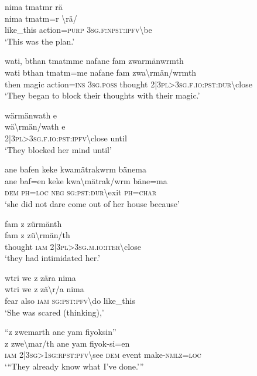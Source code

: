 \ea\label{ex:7:a4800}
nima tmatmr rä\\
\gll nima	tmatm=r	{\textbackslash}rä/\\
     like\_this	action=\textsc{purp}	3\textsc{sg}.\textsc{f}:\textsc{npst}:\textsc{ipfv}{\textbackslash}be\\
\glt `This was the plan.'
\z

\ea\label{ex:7:a4801}
wati, bthan tmatmme nafane fam zwarmänwrmth\\
\gll wati	bthan	tmatm=me	nafane	fam	zwa{\textbackslash}rmän/wrmth\\
     then	magic	action=\textsc{ins}	3\textsc{sg}.\textsc{poss}	thought	2|3\textsc{pl}>3\textsc{sg}.\textsc{f}.\textsc{io}:\textsc{pst}:\textsc{dur}{\textbackslash}close\\
\glt `They began to block their thoughts with their magic.'
\z

\ea\label{ex:7:a4802}
wärmänwath e\\
\gll wä{\textbackslash}rmän/wath	e\\
     2|3\textsc{pl}>3\textsc{sg}.\textsc{f}.\textsc{io}:\textsc{pst}:\textsc{ipfv}{\textbackslash}close	until\\
\glt `They blocked her mind until'
\z

\ea\label{ex:7:a4803}
ane bafen keke kwamätrakwrm bänema\\
\gll ane	baf=en	keke	kwa{\textbackslash}mätrak/wrm	bäne=ma\\
     \textsc{dem}	\textsc{ph}=\textsc{loc}	\textsc{neg}	\textsc{sg}:\textsc{pst}:\textsc{dur}{\textbackslash}exit	\textsc{ph}=\textsc{char}\\
\glt `she did not dare come out of her house because'
\z

\ea\label{ex:7:a4805}
fam z zürmänth\\
\gll fam	z	zü{\textbackslash}rmän/th\\
     thought	\textsc{iam}	2|3\textsc{pl}>3\textsc{sg}.\textsc{m}.\textsc{io}:\textsc{iter}{\textbackslash}close\\
\glt `they had intimidated her.'
\z

\ea\label{ex:7:a4806}
wtri we z zära nima\\
\gll wtri	we	z	zä{\textbackslash}r/a	nima\\
     fear	also	\textsc{iam}	\textsc{sg}:\textsc{pst}:\textsc{pfv}{\textbackslash}do	like\_this\\
\glt `She was scared (thinking),'
\z

\ea\label{ex:7:a4807}
``z zwemarth ane yam fiyoksin''\\
\gll z	zwe{\textbackslash}mar/th	ane	yam	fiyok-si=en\\
     \textsc{iam}	2|3\textsc{sg}>1\textsc{sg}:\textsc{rpst}:\textsc{pfv}{\textbackslash}see	\textsc{dem}	event	make-\textsc{nmlz}=\textsc{loc}\\
\glt `{``}They already know what I've done.'''
\z

